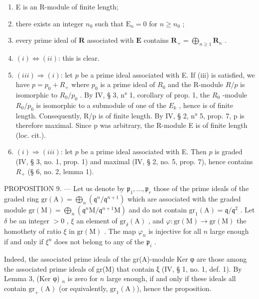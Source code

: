 \begin{enumerate}
\def\labelenumi{(\roman{enumi})}
\item
  E is an R-module of finite length;
\item
  there exists an integer \(n_0\) such that \(\mathrm{E}_n = 0\) for \(n \geqslant n_0\) ;
\item
  every prime ideal of \(\mathbf{R}\) associated with \(\mathbf{E}\) contains \(\mathbf{R}_{+} = \bigoplus_{n\geqslant 1}\mathbf{R}_{n}\) .
\item
  \((i) \Leftrightarrow (ii)\): this is clear.
\item
  \((iii) \Rightarrow (i)\): let \(p\) be a prime ideal associated with E. If (iii) is satisfied, we have \(p = p_0 + R_+\) where \(p_0\) is a prime ideal of \(R_0\) and the R-module \(R/p\) is isomorphic to \(R_0/p_0\) . By IV, § 3, n° 1, corollary of prop. 1, the \(R_0\) -module \(R_0/p_0\) is isomorphic to a submodule of one of the \(E_k\) , hence is of finite length. Consequently, R/p is of finite length. By IV, § 2, n° 5, prop. 7, p is therefore maximal. Since p was arbitrary, the R-module E is of finite length (loc. cit.).
\item
  \((i) \Rightarrow (iii)\): let \(p\) be a prime ideal associated with E. Then \(p\) is graded (IV, § 3, no. 1, prop. 1) and maximal (IV, § 2, no. 5, prop. 7), hence contains \(R_{+}\) (§ 6, no. 2, lemma 1).
\end{enumerate}

PROPOSITION 9. --- Let us denote by \(\mathfrak{p}_1, \ldots, \mathfrak{p}_r\) those of the prime ideals of the graded ring \(\mathrm{gr}(\mathrm{A}) = \bigoplus_{n} (\mathfrak{q}^n / \mathfrak{q}^{n+1})\) which are associated with the graded module \(\mathrm{gr}(\mathrm{M}) = \bigoplus_{n} (\mathfrak{q}^n \mathrm{M} / \mathfrak{q}^{n+1} \mathrm{M})\) and do not contain \(\mathrm{gr}_1(\mathrm{A}) = \mathfrak{q} / \mathfrak{q}^2\) . Let \(\delta\) be an integer \(>0\) , \(\xi\) an element of \(\mathrm{gr}_{\delta}(\mathrm{A})\) , and \(\varphi : \mathrm{gr}(\mathrm{M}) \to \mathrm{gr}(\mathrm{M})\) the homothety of ratio \(\xi\) in \(\mathrm{gr}(\mathrm{M})\) . The map \(\varphi_n\) is injective for all \(n\) large enough if and only if \(\xi^n\) does not belong to any of the \(\mathfrak{p}_i\) .

Indeed, the associated prime ideals of the gr(A)-module Ker φ are those among the associated prime ideals of gr(M) that contain ξ (IV, § 1, no. 1, def. 1). By Lemma 3, (Ker φ) \(_n\) is zero for \(n\) large enough, if and only if these ideals all contain \(\mathrm{gr}_{+}(\mathrm{A})\) (or equivalently, \(\mathrm{gr}_{1}(\mathrm{A})\)), hence the proposition.

